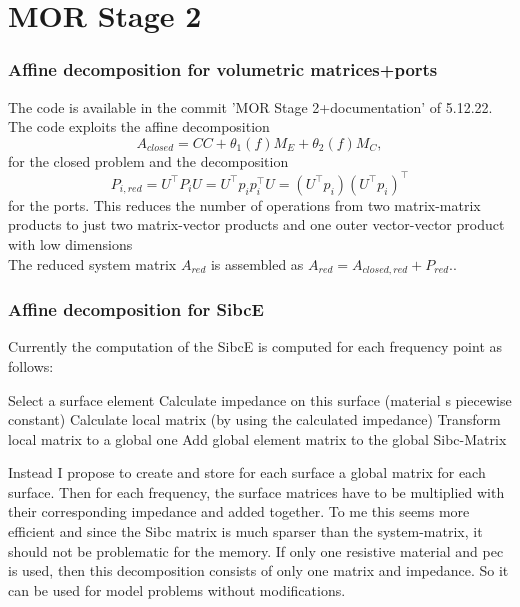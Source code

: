 














\section{MOR Stage 2}

\subsubsection{Affine decomposition for volumetric matrices+ports}
The code is available in the commit 'MOR Stage 2+documentation' of 5.12.22. The code exploits the affine decomposition 
\begin{equation}
	A_{closed}=CC+\theta_1(f)M_E+\theta_2(f)M_C,
\end{equation}
for the closed problem and the decomposition
\begin{equation}
	P_{i,red}=U^\top P_i U = U^\top p_i p_i^\top U = (U^\top p_i) (U^\top p_i)^\top
\end{equation}
for the ports. This reduces the number of operations from two matrix-matrix products to just two matrix-vector products and one outer vector-vector product with low dimensions\\

 The reduced system matrix $A_{red}$ is assembled as $A_{red}=A_{closed,red}+P_{red}$..\\
 
\subsubsection{Affine decomposition for SibcE}
Currently the computation of the SibcE is computed for each frequency point as follows:
\begin{algorithmic}[1]
	\State Select a surface element
	\State Calculate impedance on this surface (material s piecewise constant)
	\State Calculate local matrix (by using the calculated impedance)
	\State Transform local matrix to a global one
	\State Add global element matrix to the global Sibc-Matrix
\end{algorithmic}
Instead I propose to create and store for each surface a global matrix for each surface. Then for each frequency, the surface matrices have to be multiplied with their corresponding impedance and added together. To me this seems more efficient and since the Sibc matrix is much sparser than the system-matrix, it should not be problematic for the memory. If only one resistive material and pec is used, then this decomposition consists of only one matrix and impedance. So it can be used for model problems without modifications.
\\

